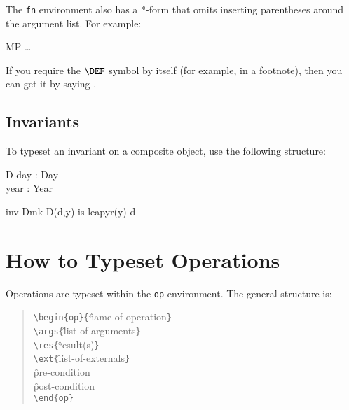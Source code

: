 {The {\tt fn} environment also has a *-form that omits inserting
parentheses around the argument list.  For example:


\begin{leftside}
\begin{fn*}{MP}{\rho\sigma}
\ldots
\end{fn*}
\end{leftside}

If you require the $\DEF$ symbol by itself (for example, in a
footnote), then you can get it by saying \cs\DEF.

\subsection*{Invariants}

To typeset an invariant on a composite object, use the following
structure:

\begin{leftside}
\begin{record}{D}
  day : Day \\
  year : Year
\end{record}
\where
\begin{fn}{inv-D}{mk-D(d,y)}
  is-leapyr(y) \Or d 
\end{fn}
\end{leftside}


\section*{How to Typeset Operations}

Operations are typeset within the {\tt op\/} environment.
The general structure is:

\begin{verse}
\verb;\begin{op}{;\^{name-of-operation}\verb;}; \\
\verb;\args{;\^{list-of-arguments}\verb;}; \\
\verb;\res{;\^{result(s)}\verb;}; \\
\verb;\ext{;\^{list-of-externals}\verb;}; \\
\^{pre-condition} \\
\^{post-condition} \\
\verb;\end{op};
\end{verse}

}
